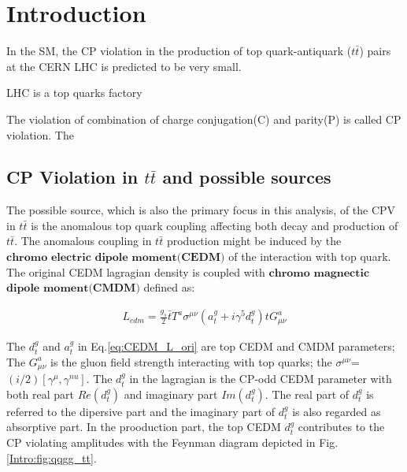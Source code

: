 

\section{Introduction}
\label{sec:Introduction}


	In the SM, the CP violation in the production of top quark-antiquark ($t\bar{t}$) pairs at the CERN LHC is predicted to be very small.
	
	LHC is a top quarks factory


	The violation of combination of charge conjugation(C) and parity(P) is called CP violation. The 


	\subsection{CP Violation in $t\bar{t}$ and possible sources}
	\label{ssec:Intro_CPVpossible}

	The possible source, which is also the primary focus in this analysis, of the CPV in $t\bar{t}$ is the anomalous top quark coupling affecting both decay and production of $t\bar{t}$. The anomalous coupling in $t\bar{t}$ production might be induced by the $\textbf{chromo electric dipole moment(CEDM)}$ of the interaction with top quark. The original CEDM lagragian density is coupled with $\textbf{chromo}$ $\textbf{magnectic}$ $\textbf{dipole}$ $\textbf{moment(CMDM)}$ defined as:

	\begin{equation}
	\begin{split}
	L_{cdm} = \frac{g_s}{2} \bar{t} T^a\sigma^{\mu \nu}(a_t^g + i \gamma^5 d_t^g) t G^a_{\mu \nu}
	\label{eq:CEDM_L_ori}
	\end{split}
	\end{equation}
	\FloatBarrier

	The $d_t^g$ and $a_t^g$ in Eq.\ref{eq:CEDM_L_ori} are top CEDM and CMDM parameters; The $G^a_{\mu \nu}$ is the gluon field strength interacting with top quarks; the $\sigma^{\mu \nu}$=$(i/2) [\gamma^{\mu},\gamma^{nu}]$.
	The $d_t^g$ in the lagragian is the CP-odd CEDM parameter with both real part $Re(d_t^g)$ and imaginary part $Im(d_t^g)$. \cite{Zhou:1998wz} The real part of $d_t^g$ is referred to the dipersive part and the imaginary part of $d_t^g$ is also regarded as absorptive part. In the prooduction part, the top CEDM $d_t^g$ contributes to the CP violating amplitudes with the Feynman diagram depicted in Fig.\ref{Intro:fig:qqgg_tt}.

